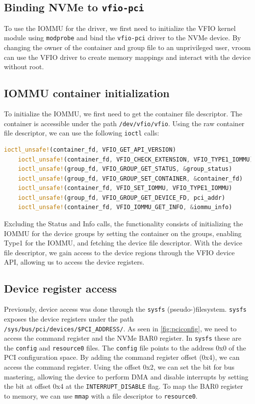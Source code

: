 \subsection{Binding NVMe to \texttt{vfio-pci}}\label{sec:bindvfiopci}
To use the IOMMU for the driver, we first need to initialize the VFIO kernel module using \texttt{modprobe} and bind the \texttt{vfio-pci} driver to the NVMe device. By changing the owner of the container and group file to an unprivileged user, vroom can use the VFIO driver to create memory mappings and interact with the device without root.

\subsection{IOMMU container initialization}\label{sec:iommuinit}
To initialize the IOMMU, we first need to get the container file descriptor. The container is accessible under the path \texttt{/dev/vfio/vfio}. Using the raw container file descriptor, we can use the following \texttt{ioctl} calls:

\begin{lstlisting}[language=Rust, caption={\texttt{ioctl} calls needed for IOMMU initialization}, label=lst:containerioctls]
    ioctl_unsafe!(container_fd, VFIO_GET_API_VERSION)
    ioctl_unsafe!(container_fd, VFIO_CHECK_EXTENSION, VFIO_TYPE1_IOMMU)
    ioctl_unsafe!(group_fd, VFIO_GROUP_GET_STATUS, &group_status)
    ioctl_unsafe!(group_fd, VFIO_GROUP_SET_CONTAINER, &container_fd)
    ioctl_unsafe!(container_fd, VFIO_SET_IOMMU, VFIO_TYPE1_IOMMU)
    ioctl_unsafe!(group_fd, VFIO_GROUP_GET_DEVICE_FD, pci_addr)
    ioctl_unsafe!(container_fd, VFIO_IOMMU_GET_INFO, &iommu_info)   
\end{lstlisting}

Excluding the Status and Info calls, the functionality consists of initializing the IOMMU for the device groups by setting the container on the groups, enabling Type1 for the IOMMU, and fetching the device file descriptor. With the device file descriptor, we gain access to the device regions through the VFIO device API, allowing us to access the device registers.

\subsection{Device register access}\label{sec:pcieconfig}
Previously, device access was done through the \texttt{sysfs} (pseudo-)filesystem. \texttt{sysfs} exposes the device registers under the path \texttt{/sys/bus/pci/devices/\$PCI\_ADDRESS/}. As seen in \autoref{fig:pciconfig}, we need to access the command register and the NVMe BAR0 register. In \texttt{sysfs} these are the \texttt{config} and \texttt{resource0} files. The \texttt{config} file points to the address 0x0 of the PCI configuration space. By adding the command register offset (0x4), we can access the command register. Using the offset 0x2, we can set the bit for bus mastering, allowing the device to perform DMA and disable interrupts by setting the bit at offset 0x4 at the \texttt{INTERRUPT\_DISABLE} flag.
To map the BAR0 register to memory, we can use \texttt{mmap} with a file descriptor to \texttt{resource0}.

